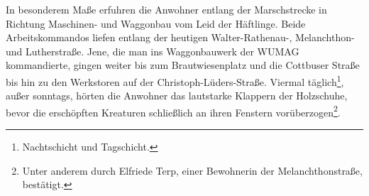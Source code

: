 
In besonderem Maße erfuhren die Anwohner entlang der Marschstrecke in Richtung Maschinen- und Waggonbau vom Leid der Häftlinge. Beide Arbeitskommandos liefen entlang der heutigen Walter-Rathenau-, Melanchthon- und Lutherstraße. Jene, die man ins Waggonbauwerk der WUMAG kommandierte, gingen weiter bis zum Brautwiesenplatz und die Cottbuser Straße bis hin zu den Werkstoren auf der Christoph-Lüders-Straße. Viermal täglich\footnote{Nachtschicht und Tagschicht.}, außer sonntags, hörten die Anwohner das lautstarke Klappern der Holzschuhe, bevor die erschöpften Kreaturen schließlich an ihren Fenstern vorüberzogen\footnote{Unter anderem durch Elfriede Terp, einer Bewohnerin der Melanchthonstraße, bestätigt.}.


